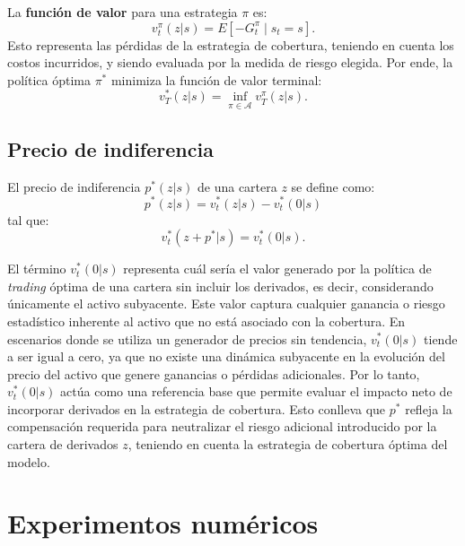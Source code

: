 \documentclass[11pt,a4paper,spanish]{article}
\numberwithin{equation}{section} %
\begin{document}
La \textbf{función de valor} para una estrategia \( \pi \) es:
\begin{equation}
v_t^\pi(z | s) = E \left[ -G_t^\pi \mid s_t = s \right].
\end{equation}
Esto representa las pérdidas de la estrategia de cobertura, teniendo en cuenta los costos incurridos, y siendo evaluada por la medida de riesgo elegida. Por ende, la política óptima \( \pi^* \) minimiza la función de valor terminal:
\begin{equation}
v_T^*(z | s) = \inf_{\pi \in \mathcal{A}} v_T^\pi(z | s).
\end{equation}



\subsection{Precio de indiferencia}

El precio de indiferencia \( p^*(z | s) \) de una cartera \( z \) se define como:
\begin{equation}
p^*(z | s) = v_t^*(z | s) - v_t^*(0 | s)
\end{equation}
tal que:
\begin{equation}
v_t^*(z + p^* | s) = v_t^*(0 | s).
\end{equation}

El término \( v_t^*(0 | s) \) representa cuál sería el valor generado por la política de \textit{trading} óptima de una cartera sin incluir los derivados, es decir, considerando únicamente el activo subyacente. Este valor captura cualquier ganancia o riesgo estadístico inherente al activo que no está asociado con la cobertura. En escenarios donde se utiliza un generador de precios sin tendencia, \( v_t^*(0 | s) \) tiende a ser igual a cero, ya que no existe una dinámica subyacente en la evolución del precio del activo que genere ganancias o pérdidas adicionales. Por lo tanto, \( v_t^*(0 | s) \) actúa como una referencia base que permite evaluar el impacto neto de incorporar derivados en la estrategia de cobertura. Esto conlleva que \(p^*\) refleja la compensación requerida para neutralizar el riesgo adicional introducido por la cartera de derivados \( z \), teniendo en cuenta la estrategia de cobertura óptima del modelo. 


\newpage


\section{Experimentos numéricos}\label{sec:experimentos_numericos}
\end{document}
